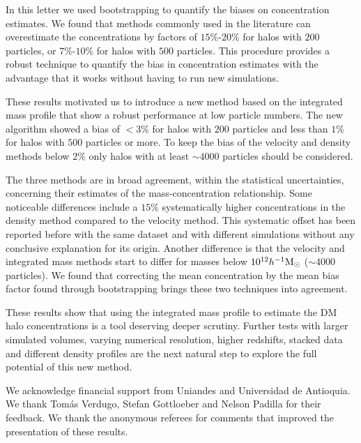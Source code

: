 \documentclass{emulateapj}
\newcommand{\hMsun}{{\ifmmode{h^{-1}{\rm {M_{\odot}}}}\else{$h^{-1}{\rm{M_{\odot}}}$}\fi}}
\begin{document}
In this letter we used bootstrapping to quantify the biases on
concentration estimates. 
We found that methods commonly used in the literature can overestimate
the concentrations by factors of $15\%$-$20\%$ for halos with $200$
particles, or $7\%$-$10\%$ for halos with $500$ particles.  
This procedure provides a robust technique to quantify the bias in
concentration estimates with the advantage that it works without
having to run new simulations. 

These results motivated us to introduce a new method based on the
integrated mass profile that show a robust performance at low particle
numbers. 
The new algorithm showed a bias  of $< 3\%$ for halos with $200$
particles and less than $1\%$ for halos with $500$ particles or more.  
To keep the bias of the velocity and density methods below $2\%$ only halos
with at least $\sim 4000$ particles should be considered.


The three methods are in broad agreement, within the statistical
uncertainties, concerning their estimates of the  mass-concentration
relationship. 
Some noticeable differences include a $15\%$ systematically higher 
concentrations in the density method compared to the velocity method.
This systematic offset has been reported before with the same dataset 
\citep{Prada2012} and with different simulations \citep{Klypin2016}
without any conclusive explanation for its origin. 
Another difference is that the velocity and integrated mass methods
start to differ for masses below $10^{12}\hMsun$ ($\sim 4000$
particles).   
We found that correcting the mean concentration by the mean bias
factor found through bootstrapping brings these two techniques into
agreement. 

These results show that using the integrated mass profile to estimate the
DM halo concentrations is a tool deserving deeper scrutiny.   
Further tests with larger simulated volumes, varying numerical
resolution, higher redshifts, stacked data and different density
profiles are the next natural step to explore the full potential of
this new method.   

\vspace{0.1cm}

 We acknowledge financial support from Uniandes
 and Universidad de Antioquia. 
 We thank Tom\'as Verdugo, Stefan Gottloeber and Nelson  Padilla for
their feedback.
We thank the anonymous referees for comments that improved
the presentation of these results. 


%
\end{document}
